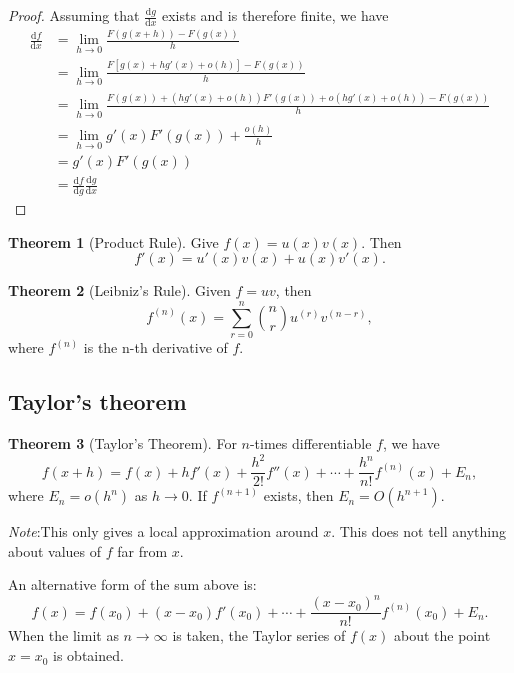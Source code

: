 \documentclass[a4paper]{article}
\theoremstyle{definition}
\newtheorem*{thm}{Theorem}
\newcommand{\note}{\noindent \emph{Note}:\;}
\renewcommand{\d}{\mathrm{d}}
\begin{document}
\begin{proof}
  Assuming that $\frac{\d g}{\d x}$ exists and is therefore finite, we have
  \begin{align*}
    \frac{\d f}{\d x} &= \lim_{h\to 0}\frac{F(g(x + h)) - F(g(x))}{h}\\
    &= \lim_{h\to 0}\frac{F[g(x) + hg'(x) + o(h)] - F(g(x))}{h}\\
    &= \lim_{h\to 0}\frac{F(g(x)) + (hg'(x) + o(h))F'(g(x)) + o(hg'(x) + o(h)) - F(g(x))}{h}\\
    &= \lim_{h\to 0}g'(x)F'(g(x)) + \frac{o(h)}{h}\\
    &= g'(x)F'(g(x))\\
    &= \frac{\d f}{\d g}\frac{\d g}{\d x}
  \end{align*}
\end{proof}

\begin{thm}[Product Rule]
  Give $f(x) = u(x)v(x)$. Then 
  \[
  f'(x) = u'(x)v(x) + u(x)v'(x).
  \]
\end{thm}

\begin{thm}[Leibniz's Rule]
  Given $f = uv$, then 
  \[
  f^{(n)}(x) = \sum_{r = 0}^n {n\choose r}u^{(r)}v^{(n - r)},
  \]
where $f^{(n)}$ is the n-th derivative of $f$.
\end{thm}

\subsection{Taylor's theorem}
\begin{thm}[Taylor's Theorem]
  For $n$-times differentiable $f$, we have
  \[
  f(x + h) = f(x) + hf'(x) + \frac{h^2}{2!}f''(x) + \cdots + \frac{h^n}{n!}f^{(n)}(x) + E_n,
  \]
  where $E_n = o(h^{n})$ as $h\to 0$. If $f^{(n+1)}$ exists, then $E_n = O(h^{n+1})$.
\end{thm}
\note This only gives a local approximation around $x$. This does not tell anything about values of $f$ far from $x$.

An alternative form of the sum above is:
\[
f(x) = f(x_0) + (x-x_0)f'(x_0) + \cdots + \frac{(x-x_0)^n}{n!}f^{(n)}(x_0) + E_n.
\]
When the limit as $n\to \infty$ is taken, the Taylor series of $f(x)$ about the point $x = x_0$ is obtained.
\end{document}
